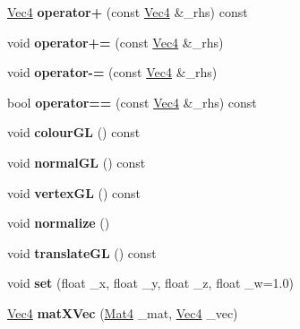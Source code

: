 \begin{DoxyCompactItemize}
\item 
\hypertarget{classVec4_a58014ec694674a8c27587a03037f0f09}{
\hyperlink{classVec4}{Vec4} {\bfseries operator+} (const \hyperlink{classVec4}{Vec4} \&\_\-rhs) const }
\label{classVec4_a58014ec694674a8c27587a03037f0f09}

\item 
\hypertarget{classVec4_a9d7dbf4c6dc031cbed8a0d5938021821}{
void {\bfseries operator+=} (const \hyperlink{classVec4}{Vec4} \&\_\-rhs)}
\label{classVec4_a9d7dbf4c6dc031cbed8a0d5938021821}

\item 
\hypertarget{classVec4_a92e2e5400ea9c6697360462276175034}{
void {\bfseries operator-\/=} (const \hyperlink{classVec4}{Vec4} \&\_\-rhs)}
\label{classVec4_a92e2e5400ea9c6697360462276175034}

\item 
\hypertarget{classVec4_a179aabcc9171e5daeb9d95503ecf86af}{
bool {\bfseries operator==} (const \hyperlink{classVec4}{Vec4} \&\_\-rhs) const }
\label{classVec4_a179aabcc9171e5daeb9d95503ecf86af}

\item 
\hypertarget{classVec4_ab6408ead37201958bbf4a9680b8d65a9}{
void {\bfseries colourGL} () const }
\label{classVec4_ab6408ead37201958bbf4a9680b8d65a9}

\item 
\hypertarget{classVec4_aefca6527cea99964c2075a02de8b341d}{
void {\bfseries normalGL} () const }
\label{classVec4_aefca6527cea99964c2075a02de8b341d}

\item 
\hypertarget{classVec4_ae637ea15f081d10860629ec70f95929a}{
void {\bfseries vertexGL} () const }
\label{classVec4_ae637ea15f081d10860629ec70f95929a}

\item 
\hypertarget{classVec4_aecf9d5a3003c2a443098b4d80bc9dea6}{
void {\bfseries normalize} ()}
\label{classVec4_aecf9d5a3003c2a443098b4d80bc9dea6}

\item 
\hypertarget{classVec4_a7d08eb201ea4fd8d57bb0d8bb404e5ce}{
void {\bfseries translateGL} () const }
\label{classVec4_a7d08eb201ea4fd8d57bb0d8bb404e5ce}

\item 
\hypertarget{classVec4_afb9eec56a123ff32eeaca42f6297ccd6}{
void {\bfseries set} (float \_\-x, float \_\-y, float \_\-z, float \_\-w=1.0)}
\label{classVec4_afb9eec56a123ff32eeaca42f6297ccd6}

\item 
\hypertarget{classVec4_aafe2b900e197390515bc1c6f160164a5}{
\hyperlink{classVec4}{Vec4} {\bfseries matXVec} (\hyperlink{classMat4}{Mat4} \_\-mat, \hyperlink{classVec4}{Vec4} \_\-vec)}
\label{classVec4_aafe2b900e197390515bc1c6f160164a5}

\end{DoxyCompactItemize}
